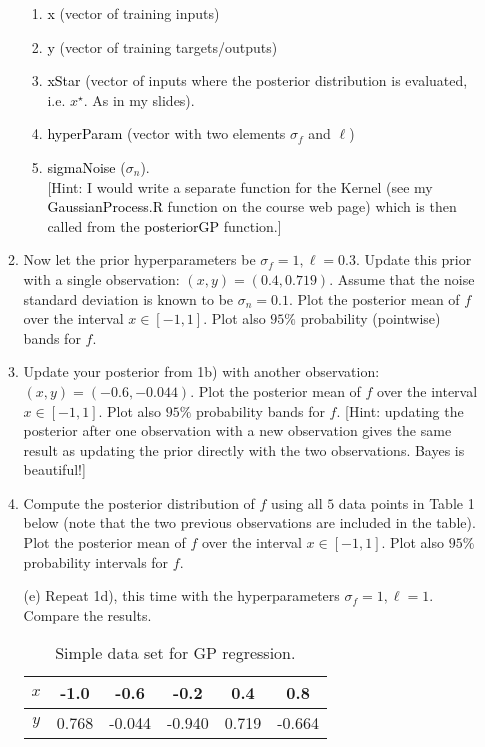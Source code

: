 \documentclass[11pt,english]{article}\usepackage[]{graphicx}\usepackage[]{color}
\providecommand{\tabularnewline}{\\}
\begin{document}
\begin{enumerate}
\begin{enumerate}
\begin{enumerate}
\item \textsf{\textcolor{black}{x}} (vector of training inputs)
\item \textsf{\textcolor{black}{y}} (vector of training targets/outputs)
\item \textsf{\textcolor{black}{xStar}} (vector of inputs where the posterior
distribution is evaluated, i.e. $x^{\star}$. As in my slides).
\item \textsf{\textcolor{black}{hyperParam}} (vector with two elements $\sigma_{f}$
and $\ell$)
\item \textsf{\textcolor{black}{sigmaNoise}} ($\sigma_{n}$).\\
{[}Hint: I would write a separate function for the Kernel (see my
\textsf{\textcolor{black}{GaussianProcess.R}} function on the course
web page) which is then called from the \textsf{\textcolor{black}{posteriorGP}}
function.{]}
\end{enumerate}
\item Now let the prior hyperparameters be $\sigma_{f}=1,\ell=0.3$. Update
this prior with a single observation: $(x,y)=(0.4,0.719)$. Assume
that the noise standard deviation is known to be $\sigma_{n}=0.1$.
Plot the posterior mean of $f$ over the interval $x\in[-1,1]$. Plot
also $95\%$ probability (pointwise) bands for $f$.
\item Update your posterior from 1b) with another observation: $(x,y)=(-0.6,-0.044)$.
Plot the posterior mean of $f$ over the interval $x\in[-1,1]$. Plot
also $95\%$ probability bands for $f$. {[}Hint: updating the posterior
after one observation with a new observation gives the same result
as updating the prior directly with the two observations. Bayes is
beautiful!{]}
\item Compute the posterior distribution of $f$ using all $5$ data points
in Table 1 below (note that the two previous observations are included
in the table). Plot the posterior mean of $f$ over the interval $x\in[-1,1]$.
Plot also $95\%$ probability intervals for $f$.
\item [(e)]Repeat 1d), this time with the hyperparameters $\sigma_{f}=1,\ell=1$.
Compare the results.\\
\begin{table}
\centering{}%
\begin{tabular}{|c|c|c|c|c|c|}
\hline 
$x$ &
-1.0 &
-0.6 &
-0.2 &
0.4 &
0.8\tabularnewline
\hline 
$y$ &
0.768 &
-0.044 &
-0.940 &
0.719 &
-0.664\tabularnewline
\hline 
\end{tabular}\caption{Simple data set for GP regression.}

\end{table}
\end{enumerate}
\end{enumerate}
\end{document}
